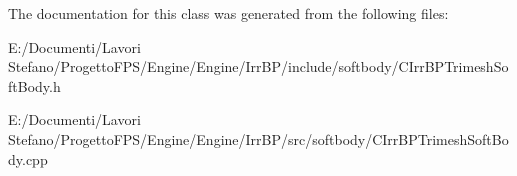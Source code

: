 The documentation for this class was generated from the following files:\begin{DoxyCompactItemize}
\item 
E:/Documenti/Lavori Stefano/ProgettoFPS/Engine/Engine/IrrBP/include/softbody/CIrrBPTrimeshSoftBody.h\item 
E:/Documenti/Lavori Stefano/ProgettoFPS/Engine/Engine/IrrBP/src/softbody/CIrrBPTrimeshSoftBody.cpp\end{DoxyCompactItemize}
